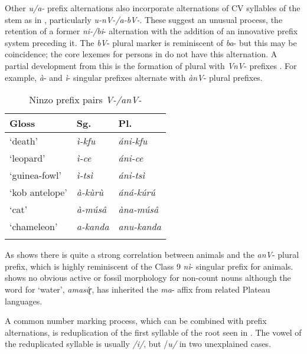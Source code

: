 \documentclass[output=paper]{langsci/langscibook}
\begin{document}
Other \textit{u/a-} prefix alternations also incorporate alternations of CV syllables of the stem as in , particularly \textit{u-nV-/a-bV-}. These suggest an unusual process, the retention of a former \textit{ni-/bi}- alternation with the addition of an innovative prefix system preceding it. The \textit{bV}- plural marker is reminiscent of  \textit{ba}- but this may be coincidence; the core lexemes for persons in  do not have this alternation. A partial development from this is the formation of plural with \textit{VnV}- prefixes . For example, \textit{à}- and \textit{ì}- singular prefixes alternate with \textit{ànV}- plural prefixes.


\begin{table}
\caption{Ninzo prefix pairs \textit{V-/anV-}}
\label{extab:nomaffplat:38}
\begin{tabularx}{\textwidth}{XXl}
\lsptoprule
Gloss 	& {Sg.} 	& {Pl.}\\
\midrule
‘death’ 	&  \itshape ì-kfu 	&  \itshape áni-kfu\\
‘leopard’ 	&  \itshape ì-ce 	&  \itshape áni-ce\\
‘guinea-fowl’ 	&  \itshape ì-tsì 	&  \itshape áni-tsì\\
‘kob antelope’ 	&  \itshape à-kùrù 	&  \itshape  áná-kúrú\\
‘cat’ 	&  \itshape à-músâ 	&  \itshape àna-músâ\\
‘chameleon’ 	&  \itshape a-kanda 	&  \itshape anu-kanda\\
\lspbottomrule 
\end{tabularx}
\end{table}

As  shows there is quite a strong correlation between animals and the \textit{anV}- plural prefix, which is highly reminiscent of the  Class 9 \textit{nì}- singular prefix for animals.  shows no obvious active or fossil morphology for non-count nouns although the word for ‘water’, \textit{amasíɽ}, has inherited the \textit{ma}- affix from related Plateau languages.

\newpage 
A common number marking process, which can be combined with prefix alternations, is reduplication of the first syllable of the root seen in . The vowel of the reduplicated syllable is usually \textit{/i/}, but /\textit{u/} in two unexplained cases. 
\end{document}
